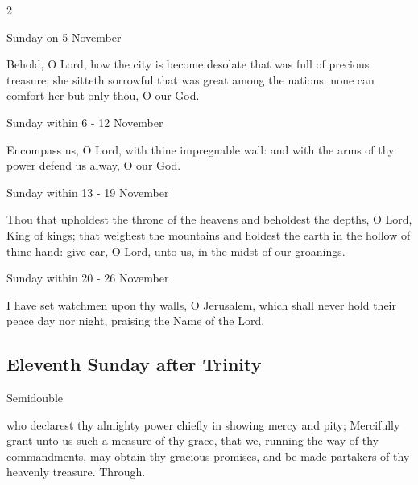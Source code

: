 \begin{multicols}{2}
\begin{inhead}
Sunday on 5 November
\end{inhead}\par\noindent
Behold, O Lord, {\dag} how the city is become desolate that was full of precious treasure; she sitteth sorrowful that was great among the nations: none can comfort her but only thou, O our God.

\begin{inhead}
Sunday within 6 - 12 November
\end{inhead}\par\noindent
Encompass us, {\dag} O Lord, with thine impregnable wall: and with the arms of thy power defend us alway, O our God.

\begin{inhead}
Sunday within 13 - 19 November
\end{inhead}\par\noindent
Thou that upholdest {\dag} the throne of the heavens and beholdest the depths, O Lord, King of kings; that weighest the mountains and holdest the earth in the hollow of thine hand: give ear, O Lord, unto us, in the midst of our groanings.

\begin{inhead}
Sunday within 20 - 26 November
\end{inhead}\par\noindent
I have set watchmen {\dag} upon thy walls, O Jerusalem, which shall never hold their peace day nor night, praising the Name of the Lord.
\end{multicols}


\subsection{Eleventh Sunday after Trinity}
\begin{inhead}
{Semidouble}
\end{inhead}



\collect
{} who declarest thy almighty power chiefly in showing mercy and pity; Mercifully grant unto us such a measure of thy grace, that we, running the way of thy commandments, may obtain thy gracious promises, and be made partakers of thy heavenly treasure. Through.


